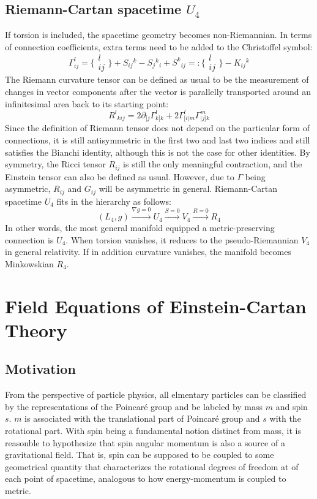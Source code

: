 \documentclass[11pt]{article}
\begin{document}
\subsection{Riemann-Cartan spacetime $U_4$}
If torsion is included, the spacetime geometry becomes non-Riemannian. In terms of connection coefficients, extra terms need to be added to the Christoffel symbol:
\[ \Gamma^l_{ij} = \{\substack{l\\ij}\} + S_{ij}{}^k - S_j{}^k{}_i + S^k{}_{ij} =: \{\substack{l\\ij}\} - K_{ij}{}^k \]
The Riemann curvature tensor can be defined as usual to be the measurement of changes in vector components after the vector is parallelly transported around an infinitesimal area back to its starting point:
\[ R^l{}_{kij} = 2\partial_{[j}\Gamma^l_{k]k} + 2\Gamma^l_{[i|m}\Gamma^m_{|j]k} \] 
Since the definition of Riemann tensor does not depend on the particular form of connections, it is still antisymmetric in the first two and last two indices and still satisfies the Bianchi identity, although this is not the case for other identities. By symmetry, the Ricci tensor $R_{ij}$ is still the only meaningful contraction, and the Einstein tensor can also be defined as usual. However, due to $\Gamma$ being asymmetric, $R_{ij}$ and $G_{ij}$ will be asymmetric in general. Riemann-Cartan spacetime $U_4$ fits in the hierarchy as follows:
\[ (L_4, g) \xrightarrow{\nabla g = 0} U_4 \xrightarrow{S=0} V_4 \xrightarrow{R = 0} R_4\]
In other words, the most general manifold equipped a metric-preserving connection is $U_4$. When torsion vanishes, it reduces to the pseudo-Riemannian $V_4$ in general relativity. If in addition curvature vanishes, the manifold becomes Minkowskian $R_4$.

\section{Field Equations of Einstein-Cartan Theory}
\subsection{Motivation \cite{hehl1976general}}
From the perspective of particle physics, all elmentary particles can be classified by the representations of the Poincar\'e group and be labeled by mass $m$ and spin $s$. $m$ is associated with the translational part of Poincar\'e group and $s$ with the rotational part. With spin being a fundamental notion distinct from mass, it is reasonble to hypothesize that spin angular momentum is also a source of a gravitational field. That is, spin can be supposed to be coupled to some geometrical quantity that characterizes the rotational degrees of freedom at of each point of spacetime, analogous to how energy-momentum is coupled to metric.
\end{document}
